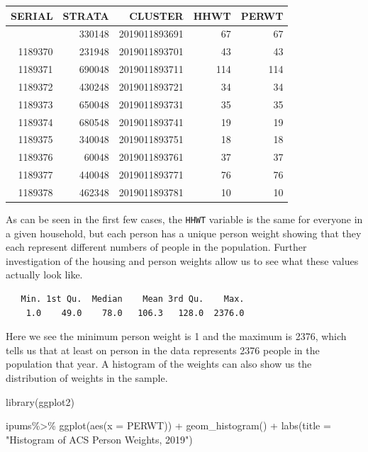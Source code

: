 \documentclass[
  letterpaper,
  DIV=11,
  numbers=noendperiod]{scrreprt}
\newenvironment{Shaded}{\begin{snugshade}}{\end{snugshade}}
\newcommand{\AttributeTok}[1]{\textcolor[rgb]{0.40,0.45,0.13}{#1}}
\newcommand{\FunctionTok}[1]{\textcolor[rgb]{0.28,0.35,0.67}{#1}}
\newcommand{\NormalTok}[1]{\textcolor[rgb]{0.00,0.23,0.31}{#1}}
\newcommand{\SpecialCharTok}[1]{\textcolor[rgb]{0.37,0.37,0.37}{#1}}
\newcommand{\StringTok}[1]{\textcolor[rgb]{0.13,0.47,0.30}{#1}}
\begin{document}
\begin{longtable}[]{@{}rrrrr@{}}
\toprule\noalign{}
SERIAL & STRATA & CLUSTER & HHWT & PERWT \\
\midrule\noalign{}
\endhead
\bottomrule\noalign{}
\endlastfoot
1189369 & 330148 & 2019011893691 & 67 & 67 \\
1189370 & 231948 & 2019011893701 & 43 & 43 \\
1189371 & 690048 & 2019011893711 & 114 & 114 \\
1189372 & 430248 & 2019011893721 & 34 & 34 \\
1189373 & 650048 & 2019011893731 & 35 & 35 \\
1189374 & 680548 & 2019011893741 & 19 & 19 \\
1189375 & 340048 & 2019011893751 & 18 & 18 \\
1189376 & 60048 & 2019011893761 & 37 & 37 \\
1189377 & 440048 & 2019011893771 & 76 & 76 \\
1189378 & 462348 & 2019011893781 & 10 & 10 \\
\end{longtable}

As can be seen in the first few cases, the \texttt{HHWT} variable is the
same for everyone in a given household, but each person has a unique
person weight showing that they each represent different numbers of
people in the population. Further investigation of the housing and
person weights allow us to see what these values actually look like.

\begin{Shaded}
\end{Shaded}

\begin{verbatim}
   Min. 1st Qu.  Median    Mean 3rd Qu.    Max. 
    1.0    49.0    78.0   106.3   128.0  2376.0 
\end{verbatim}

Here we see the minimum person weight is 1 and the maximum is 2376,
which tells us that at least on person in the data represents 2376
people in the population that year. A histogram of the weights can also
show us the distribution of weights in the sample.

\begin{Shaded}
\begin{Highlighting}[]
\FunctionTok{library}\NormalTok{(ggplot2)}

\NormalTok{ipums}\SpecialCharTok{\%\textgreater{}\%}
  \FunctionTok{ggplot}\NormalTok{(}\FunctionTok{aes}\NormalTok{(}\AttributeTok{x =}\NormalTok{ PERWT)) }\SpecialCharTok{+}
    \FunctionTok{geom\_histogram}\NormalTok{() }\SpecialCharTok{+} 
  \FunctionTok{labs}\NormalTok{(}\AttributeTok{title =} \StringTok{"Histogram of ACS Person Weights, 2019"}\NormalTok{)}
\end{Highlighting}
\end{Shaded}
\end{document}
